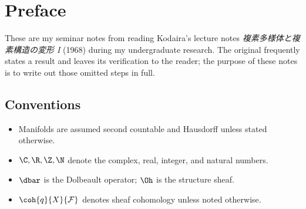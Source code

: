 \chapter*{Preface}

These are my seminar notes from reading Kodaira's lecture notes
\emph{複素多様体と複素構造の変形 I} (1968) during my undergraduate research.
The original frequently states a result and leaves its verification to the
reader; the purpose of these notes is to write out those omitted steps in full.

\section*{Conventions}

\begin{itemize}
  \item Manifolds are assumed second countable and Hausdorff unless stated otherwise.
  \item $\C,\R,\Z,\N$ denote the complex, real, integer, and natural numbers.
  \item $\dbar$ is the Dolbeault operator; $\Oh$ is the structure sheaf.
  \item $\coh{q}{X}{\mathcal{F}}$ denotes sheaf cohomology unless noted otherwise.
\end{itemize}
